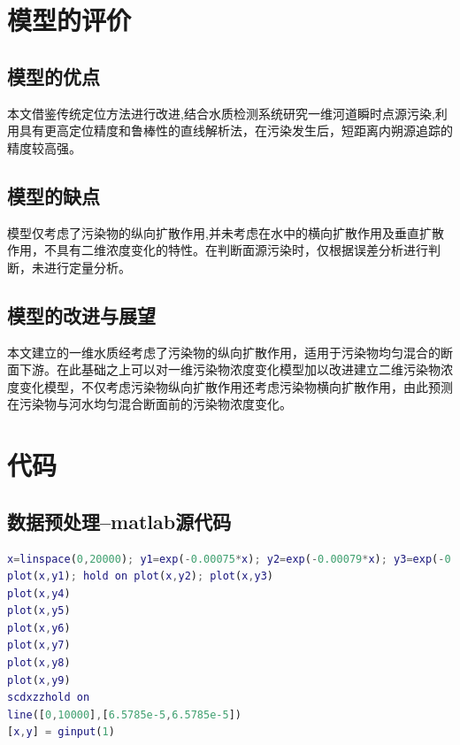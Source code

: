 \documentclass{whutmod}
\begin{document}
	\section{模型的评价}
	\subsection{模型的优点}
	本文借鉴传统定位方法进行改进,结合水质检测系统研究一维河道瞬时点源污染,利用具有更高定位精度和鲁棒性的直线解析法，在污染发生后，短距离内朔源追踪的精度较高强。
	
	\subsection{模型的缺点}
模型仅考虑了污染物的纵向扩散作用,并未考虑在水中的横向扩散作用及垂直扩散作用，不具有二维浓度变化的特性。在判断面源污染时，仅根据误差分析进行判断，未进行定量分析。


	\subsection{模型的改进与展望}
本文建立的一维水质经考虑了污染物的纵向扩散作用，适用于污染物均匀混合的断面下游。在此基础之上可以对一维污染物浓度变化模型加以改进建立二维污染物浓度变化模型，不仅考虑污染物纵向扩散作用还考虑污染物横向扩散作用，由此预测在污染物与河水均匀混合断面前的污染物浓度变化。
	\newpage	%
	
	\printbibliography[title = {参考文献}]	%
	
	
	\newpage
	\appendix %
\section{代码}
\subsection{数据预处理--matlab源代码}
\begin{lstlisting}[language=matlab]
x=linspace(0,20000); y1=exp(-0.00075*x); y2=exp(-0.00079*x); y3=exp(-0.00086*x); y4=exp(-0.00090*x); y5=exp(-0.00118*x); y6=exp(-0.00105*x); y7=exp(-0.00111*x); y8=exp(-0.00117*x); y9=exp(-0.00118*x);
plot(x,y1); hold on plot(x,y2); plot(x,y3) 
plot(x,y4)
plot(x,y5)
plot(x,y6)
plot(x,y7)
plot(x,y8)
plot(x,y9)
scdxzzhold on
line([0,10000],[6.5785e-5,6.5785e-5])
[x,y] = ginput(1)

\end{lstlisting}
\end{document}
